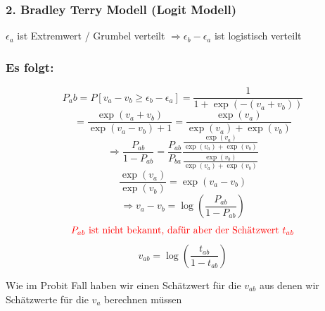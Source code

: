 	\subsubsection*{2. Bradley Terry Modell (Logit Modell)}
		$ \epsilon_a $ ist Extremwert / Grumbel verteilt
		$ \Rightarrow \epsilon_b - \epsilon_a $ ist logistisch verteilt
	\subsubsection*{Es folgt:}
		\[ P_ab = P[v_a - v_b \geq \epsilon_b - \epsilon_a] = \frac{1}{1+ \exp(-(v_a + v_b))}\]
		\[ = \frac{\exp(v_a + v_b)}{\exp(v_a - v_b) +1} = \frac{\exp(v_a)}{\exp(v_a) + \exp(v_b)}  \]
		\[ \Rightarrow \frac{P_{ab}}{1- P_{ab}} = \frac{P_{ab}}{P_{ba}} \frac{\frac{\exp(v_a)}{\exp(v_a) + \exp(v_b)}}{\frac{\exp(v_b)}{\exp(v_a) + \exp(v_b)}} \]
		\[ \frac{\exp(v_a)}{\exp(v_b)} = \exp(v_a - v_b) \]
		\[ \Rightarrow v_a - v_b = \log(\frac{P_{ab}}{1- P_{ab}})\]
		\[\textcolor{red}{\text{$ P_{ab} $ ist nicht bekannt, dafür aber der Schätzwert $ t_{ab} $}}\]
		\[ v_{ab} = \log(\frac{t_{ab}}{1 - t_{ab}}) \]
		
		Wie im Probit Fall haben wir einen Schätzwert für die $ v_{ab} $ aus denen wir Schätzwerte für die $ v_a $ berechnen müssen

	
	
	
